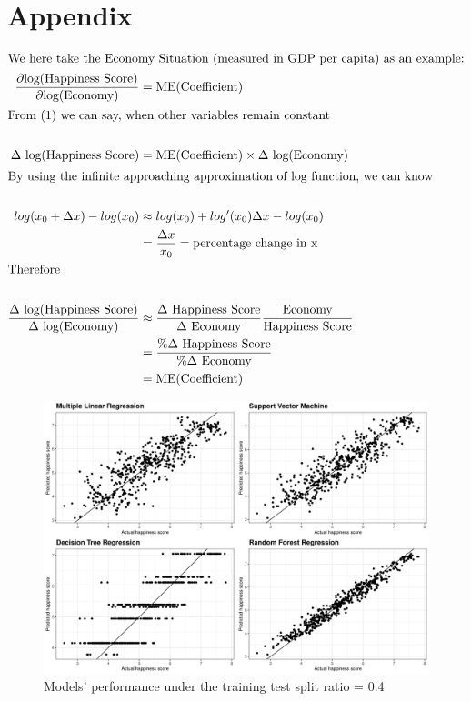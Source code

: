 \documentclass[11pt,a4paper,]{article}
\begin{document}
\hypertarget{appendix}{%
\section{Appendix}\label{appendix}}

\begin{align*}
\intertext{We here take the Economy Situation (measured in GDP per capita) as an example:}
\frac{\partial \text{log(Happiness Score)}}{\partial \text{log(Economy)}} &= \text{ME(Coefficient)}\\
\intertext{From (1) we can say, when other variables remain constant }\nonumber \\
\Delta \text{ log(Happiness Score)} &= \text{ME(Coefficient)} \times \Delta \text{ log(Economy)}\\
\intertext{By using the infinite approaching approximation of log function, we can know}\nonumber\\
log(x_0 + \Delta x) - log(x_0) &\approx log(x_0) + log'(x_0)\Delta x - log(x_0)\\
&=  \frac{\Delta x}{x_0} = \text{percentage change in x}\nonumber\\
\intertext{Therefore}\nonumber\\
\frac{\Delta \text{ log(Happiness Score)}}{\Delta \text{ log(Economy)}} &\approx \frac{\Delta \text{ Happiness Score}}{\Delta \text{ Economy} }\frac{\text{Economy}}{\text{Happiness Score}}\\
&=\frac{\% \Delta \text{ Happiness Score}}{\% \Delta \text{ Economy}} \nonumber\\
&= \text{ME(Coefficient)}\nonumber
\end{align*}

\begin{figure}

{\centering \includegraphics[width=0.7\linewidth]{figure/ggsp04} 

}

\caption{Models' performance under the training test split ratio = 0.4}\label{fig:ggsp04}
\end{figure}
\end{document}
